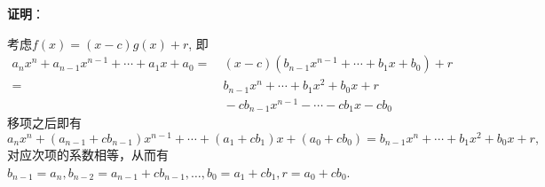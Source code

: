 \ifIncludeAnswer

\newpageorvspace

\textbf{证明}：

考虑$f(x) = (x-c)g(x) + r$, 即
\begin{align*}
a_nx^n + a_{n-1}x^{n-1} + \cdots + a_1x + a_0 = & \ (x-c) (b_{n-1}x^{n-1} + \cdots + b_1x + b_0) + r \\
= & \ b_{n-1}x^{n} + \cdots + b_1x^2 + b_0x + r \\
& \ - cb_{n-1}x^{n-1} - \cdots - cb_1x - cb_0
\end{align*}
移项之后即有
$$a_nx^n + (a_{n-1}+cb_{n-1})x^{n-1} + \cdots + (a_1+cb_1)x + (a_0 + cb_0) = b_{n-1}x^{n} + \cdots + b_1x^2 + b_0x + r,$$
对应次项的系数相等，从而有$b_{n-1} = a_n, b_{n-2} = a_{n-1}+cb_{n-1}, \ldots, b_0 = a_1+cb_1, r = a_0 + cb_0$.

\fi  %



